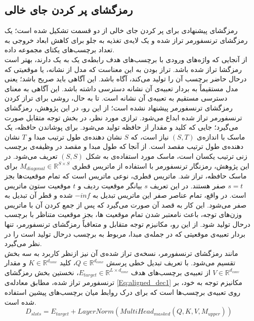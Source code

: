 \subsection{رمزگشای پر کردن جای خالی}
رمزگشای پیشنهادی برای پر کردن جای خالی از دو قسمت تشکیل شده است؛ یک رمزگشای ترنسفورمر تراز شده و یک لایه‌ی تغذیه به جلو برای کاهش ابعاد خروجی به تعداد برچسب‌های یکتای مجموعه داده.\\
 از آنجایی که واژه‌های ورودی با برچسب‌های هدف رابطه‌ی یک به یک دارند، بهتر است رمزگشا تراز شده باشد. تراز بودن به این معناست که مدل از نشانه، یا موقعیتی که درحال حاضر برچسب آن را تولید می‌کند، آگاه باشد. این آگاهی باید صریح باشد؛ یعنی مدل مستقیماً به بردار تعبیه‌ی آن نشانه دسترسی داشته باشد. این آگاهی به معنای دسترسی مستقیم به تعبیه‌ی آن نشانه است. تا به حال، روشی برای تراز کردن رمزگشای ترنسفورمر پیشنهاد نشده است؛ از این رو، در این پژوهش، رمزگشای ترنسفورمر تراز شده ابداع می‌شود. ترازی مورد نظر، در بخش توجه متقابل صورت می‌گیرد؛ جایی که کلید و مقدار از حافظه تولید می‌شود. برای پوشاندن حافظه، یک ماسک با اندازه‌ی $(S,T)$ نیاز است، که $S$ نشان دهنده‌ی طول ترتیب مبدا و $T$ نشان دهنده‌ی طول ترتیب مقصد است. از آنجا که طول مبدا و مقصد در وظیفه‌ی برچسب زنی ترتیب یکسان است، ماسک مورد استفاده‌ی به شکل $(S,S)$ تعریف می‌شود. در این پژوهش، رمزنگار ترنسفورمر با استفاده از ماتریس قطری $M_{diagonal}\in\mathbb{R}^{S\times S}$ برای ماسک حافظه، تراز شد. ماتریس قطری، نوعی ماتریس است که تمام موقعیت‌ها بجز $s=t$ صفر هستند. در این تعریف $s$ بیانگر موقعیت ردیف و $t$ موقعیت ستون ماتریس است. در واقع، تمام عناصر صفر این ماتریس تبدیل به $-inf$ شده و قطر آن تبدیل به صفر می‌شود. این کار به قصد آن صورت می‌گیرد که پس از جمع کردن آن با ماتریس وزن‌های توجه، باعث نامعتبر شدن تمام موقعیت ها، بجز موقعیت متناظر با برچسب درحال تولید شود.  از این رو، مکانیزم توجه متقابل و متعاقباً رمزگشای ترنسفورمر، تنها بردار تعبیه‌ی موقعیتی که در جمله‌ی مبدا، مربوط به برچسب درحال تولید است را در نظر می‌گیرد.\\
 مانند رمزگشای ترنسفورمر، نسخه‌ی تراز شده‌ی آن نیز ازنظر کاربرد به سه بخش تقسیم می‌شود.
 با تعریف تبدیل خطی پرسش $Q\in\mathbb{R}^{d_{conv}}$، کلید $K\in\mathbb{R}^{d_{conv}}$ و مقدار $V\in\mathbb{R}^{d_{conv}}$ از تعبیه‌ی برچسب‌های هدف $E_{target}\in\mathbb{R}^{L\times d_{conv}}$، نخستین بخش رمزگشای ترنسفورمر تراز شده، مطابق معادله‌ی \ref{Eq:aligned_dec1} مکانیزم توجه به خود، بر روی تعبیه‌ی برچسب‌ها است که برای درک روابط میان برچسب‌های پیشین استفاده شده است.
 \begin{equation}
 	D_{slots} = E_{target} + LayerNorm(MultiHead_{masked}(Q,K,V,M_{upper}))
 	\label{Eq:aligned_dec1}
 \end{equation}
